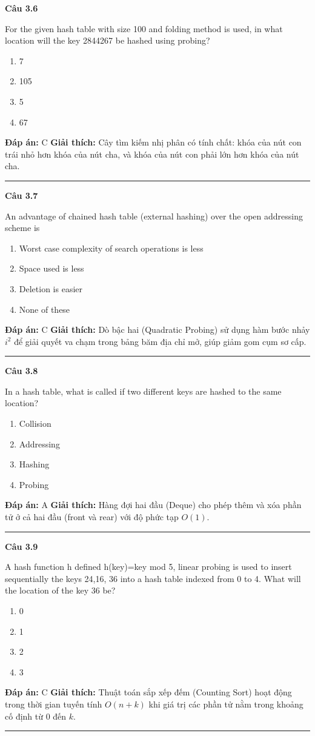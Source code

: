 \documentclass[11pt,a4paper]{article}
\newenvironment{question}[1]{%
  \par\vspace{1em}\noindent\textbf{\large Câu #1}\par\vspace{0.4em}
}{%
  \par\vspace{1em}\hrule\vspace{0.6em}
}
\newenvironment{choices}{%
  \begin{enumerate}[label=\textbf{\Alph*.},leftmargin=2.2em,itemsep=2pt,topsep=3pt]
}{%
  \end{enumerate}
}
\newcommand{\choice}{\item}
\begin{document}
\begin{question}{3.6}
For the given hash table with size 100 and folding method is used, in what location will the key 2844267 be hashed using probing?
\begin{choices}
\choice 7
\choice 105
\choice 5
\choice 67
\end{choices}
\textbf{Đáp án:} C
\textbf{Giải thích:} Cây tìm kiếm nhị phân có tính chất: khóa của nút con trái nhỏ hơn khóa của nút cha, và khóa của nút con phải lớn hơn khóa của nút cha.
\end{question}

\begin{question}{3.7}
An advantage of chained hash table (external hashing) over the open addressing scheme is
\begin{choices}
\choice Worst case complexity of search operations is less
\choice Space used is less
\choice Deletion is easier
\choice None of these
\end{choices}
\textbf{Đáp án:} C
\textbf{Giải thích:} Dò bậc hai (Quadratic Probing) sử dụng hàm bước nhảy $i^2$ để giải quyết va chạm trong bảng băm địa chỉ mở, giúp giảm gom cụm sơ cấp.
\end{question}

\begin{question}{3.8}
In a hash table, what is called if two different keys are hashed to the same location?
\begin{choices}
\choice Collision
\choice Addressing
\choice Hashing
\choice Probing
\end{choices}
\textbf{Đáp án:} A
\textbf{Giải thích:} Hàng đợi hai đầu (Deque) cho phép thêm và xóa phần tử ở cả hai đầu (front và rear) với độ phức tạp $O(1)$.
\end{question}

\begin{question}{3.9}
A hash function h defined h(key)=key mod 5, linear probing is used to insert sequentially the keys 24,16, 36 into a hash table indexed from 0 to 4. What will the location of the key 36 be?
\begin{choices}
\choice 0
\choice 1
\choice 2
\choice 3
\end{choices}
\textbf{Đáp án:} C
\textbf{Giải thích:} Thuật toán sắp xếp đếm (Counting Sort) hoạt động trong thời gian tuyến tính $O(n + k)$ khi giá trị các phần tử nằm trong khoảng cố định từ 0 đến $k$.
\end{question}
\end{document}
